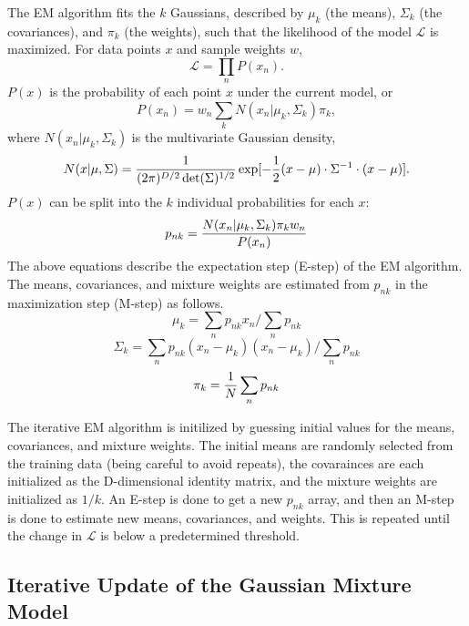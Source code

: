 \documentclass{article}
\begin{document}
The EM algorithm fits the $k$ Gaussians, described by $\mu_k$ (the means),
$\Sigma_k$ (the covariances), and $\pi_k$ (the weights), such that the likelihood
of the model $\mathscr{L}$ is maximized. For data points $x$ and sample weights
$w$,
\begin{equation}
    \mathscr{L} = \prod_n P(x_n).
\end{equation}
$P(x)$ is the probability of each point $x$ under the current model, or
\begin{equation}
    P(x_n) = w_n \sum_{k} N(x_n | \mu_k, \Sigma_k) \pi_k,
\end{equation}
where $N(x_n | \mu_k, \Sigma_k)$ is the multivariate Gaussian density,
\begin{equation}
    N(x | \mu, \Sigma) = {1 \over {(2\pi)^{D/2} \det(\Sigma)^{1/2}}}
    \exp[-{1 \over 2} (x - \mu) \cdot \Sigma^{-1} \cdot (x - \mu)].
\end{equation}
$P(x)$ can be split into the $k$ individual probabilities for each $x$:
\begin{equation}
    p_{nk} = {{N(x_n | \mu_k, \Sigma_k) \pi_k w_n} \over P(x_n)}
\end{equation}
The above equations describe the expectation step (E-step) of the EM
algorithm. The means, covariances, and mixture weights are estimated from
$p_{nk}$ in the maximization step (M-step) as follows.
\begin{equation}
    \mu_k = \sum_{n} p_{nk} x_n \Big/ \sum_{n} p_{nk}
\end{equation}
\begin{equation}
    \Sigma_k = \sum_{n} p_{nk} (x_n - \mu_k) (x_n - \mu_k) \Big/ \sum_{n} p_{nk}
\end{equation}
\begin{equation}
    \pi_k = {1 \over N} \sum_{n} p_{nk}
\end{equation}

The iterative EM algorithm is initilized by guessing initial values for the means,
covariances, and mixture weights. The initial means are randomly selected from the
training data (being careful to avoid repeats), the covarainces are each initialized
as the D-dimensional identity matrix, and the mixture weights are initialized as
$1/k$. An E-step is done to get a new $p_{nk}$ array, and then an M-step is done
to estimate new means, covariances, and weights. This is repeated until the
change in $\mathscr{L}$ is below a predetermined threshold.

\subsection{Iterative Update of the Gaussian Mixture Model}
\end{document}
